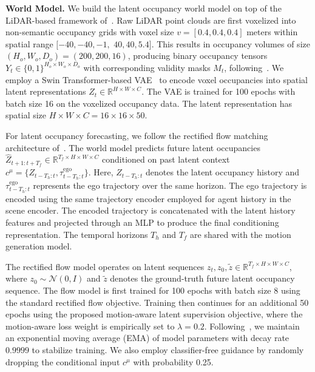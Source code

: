\documentclass[runningheads]{llncs}
\begin{document}
\vspace{2mm}


\textbf{World Model.} 
We build the latent occupancy world model on top of the LiDAR-based framework of~\cite{liu2025foundationallidarworldmodels}. Raw LiDAR point clouds are first voxelized into non-semantic occupancy grids with voxel size $v=[0.4,0.4,0.4]$ meters within spatial range $[-40,-40,-1,$ $40,40,5.4]$. This results in occupancy volumes of size $( H_o, W_o, D_o )=(200,200,16)$, producing binary occupancy tensors $Y_t \in \{0,1\}^{H_o \times W_o \times D_o}$ with corresponding validity masks $M_t$, following~\cite{tian2023occ3d}. We employ a Swin Transformer-based VAE~\cite{liu2025foundationallidarworldmodels} to encode voxel occupancies into spatial latent representations $Z_t \in \mathbb{R}^{H \times W \times C}$. The VAE is trained for 100 epochs with batch size 16 on the voxelized occupancy data. The latent representation has spatial size $H \times W \times C = 16 \times 16 \times 50$.

For latent occupancy forecasting, we follow the rectified flow matching architecture of~\cite{liu2025foundationallidarworldmodels}. The world model predicts future latent occupancies $\hat Z_{t+1:t+T_f} \in \mathbb{R}^{T_f \times H \times W \times C}$ conditioned on past latent context $c^\mu = \{Z_{t-T_h:t}, \tau_{t-T_h:t}^{\text{ego}}\}$. Here, $Z_{t-T_h:t}$ denotes the latent occupancy history and $\tau_{t-T_h:t}^{\text{ego}}$ represents the ego trajectory over the same horizon. The ego trajectory is encoded using the same trajectory encoder employed for agent history in the scene encoder. The encoded trajectory is concatenated with the latent history features and projected through an MLP to produce the final conditioning representation. The temporal horizons $T_h$ and $T_f$ are shared with the motion generation model.

The rectified flow model operates on latent sequences $z_t, z_0, \tilde{z} \in \mathbb{R}^{T_f \times H \times W \times C}$, where $z_0 \sim \mathcal{N}(0,I)$ and $\tilde{z}$ denotes the ground-truth future latent occupancy sequence. The flow model is first trained for 100 epochs with batch size 8 using the standard rectified flow objective. Training then continues for an additional 50 epochs using the proposed motion-aware latent supervision objective, where the motion-aware loss weight is empirically set to $\lambda=0.2$. Following~\cite{liu2025foundationallidarworldmodels}, we maintain an exponential moving average (EMA) of model parameters with decay rate $0.9999$ to stabilize training. We also employ classifier-free guidance by randomly dropping the conditional input $c^\mu$ with probability 0.25.
\end{document}
